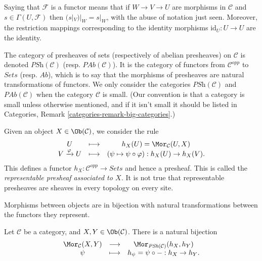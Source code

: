 \medskip\noindent
Saying that $\mathcal{F}$ is a functor means that if
$W \to V \to U$ are morphisms in $\mathcal{C}$ and
$s \in \Gamma(U, \mathcal{F})$ then
$(s|_V)|_W = s |_W$, with the abuse of
notation just seen. Moreover, the restriction mappings corresponding to
the identity morphisms $\text{id}_U : U \to U$ are the identity.

\medskip\noindent
The category of presheaves of sets (respectively of abelian presheaves) on
$\mathcal{C}$ is denoted $\textit{PSh} (\mathcal{C})$ (resp. $\textit{PAb}
(\mathcal{C})$). It is the category of functors from $\mathcal{C}^{opp}$ to
$\textit{Sets}$ (resp. $\textit{Ab}$), which is to say that the morphisms of
presheaves are natural transformations of functors. We only consider the
categories $\textit{PSh}(\mathcal{C})$ and $\textit{PAb}(\mathcal{C})$
when the category $\mathcal{C}$ is small. (Our convention is that a category
is small unless otherwise mentioned, and if it isn't small it should be
listed in Categories, Remark \ref{categories-remark-big-categories}.)

\begin{example}
\label{example-representable-presheaf}
Given an object $X \in \Ob(\mathcal{C})$, we consider the rule
$$
\begin{matrix}
U & \longmapsto & h_X(U) = \Mor_\mathcal{C}(U, X) \\
V \xrightarrow{\varphi} U & \longmapsto &
(\psi \mapsto \psi \circ \varphi) : h_X(U) \to h_X(V).
\end{matrix}
$$
This defines a functor $h_X : \mathcal{C}^{opp} \to \textit{Sets}$
and hence a presheaf. This is called the
{\it representable presheaf associated to $X$.}
It is not true that representable presheaves are sheaves in every topology on
every site.
\end{example}

\begin{lemma}[Yoneda]
\label{lemma-yoneda}
\begin{slogan}
Morphisms between objects are in bijection with natural transformations
between the functors they represent.
\end{slogan}
Let $\mathcal{C}$ be a category, and $X, Y \in
\Ob(\mathcal{C})$. There is a natural bijection
$$
\begin{matrix}
\Mor_\mathcal{C}(X, Y) &
\longrightarrow &
\Mor_{\textit{PSh}(\mathcal{C})} (h_X, h_Y) \\
\psi &
\longmapsto &
h_\psi = \psi \circ - : h_X \to h_Y.
\end{matrix}
$$
\end{lemma}

